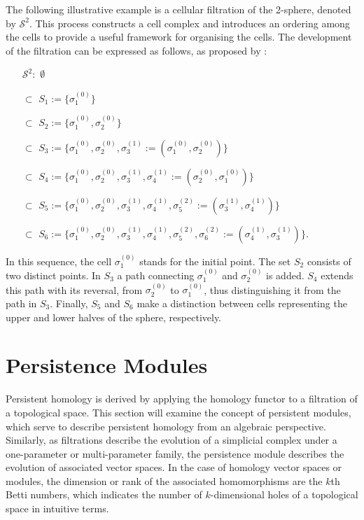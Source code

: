 \begin{example}
	\label{filteredsphere}
	The following illustrative example is a cellular filtration of the 2-sphere, denoted by $\mathcal{S}^{2}$. This process constructs a cell complex and introduces an ordering among the cells to provide a useful framework for organising the cells. The development of the filtration can be expressed as follows, as proposed by \cite[\S 2.2, Example]{de2011dualities}:
	\begin{itemize}
		\item[$\mathcal{S}^{2}:$] $\emptyset$
		\item[$\subset$] $S_{1} := \{\sigma_{1}^{(0)}\}$
		\item[$\subset$] $S_{2} := \{\sigma_{1}^{(0)}, \sigma_{2}^{(0)}\}$
		\item[$\subset$] $S_{3} := \{\sigma_{1}^{(0)}, \sigma_{2}^{(0)}, \sigma_{3}^{(1)} := (\sigma_{1}^{(0)}, \sigma_{2}^{(0)})\}$
		\item[$\subset$] $S_{4} := \{\sigma_{1}^{(0)}, \sigma_{2}^{(0)}, \sigma_{3}^{(1)}, \sigma_{4}^{(1)} := (\sigma_{2}^{(0)}, \sigma_{1}^{(0)})\}$
		\item[$\subset$] $S_{5} := \{\sigma_{1}^{(0)}, \sigma_{2}^{(0)}, \sigma_{3}^{(1)}, \sigma_{4}^{(1)}, \sigma_{5}^{(2)} := (\sigma_{3}^{(1)}, \sigma_{4}^{(1)})\}$
		\item[$\subset$] $S_{6} := \{\sigma_{1}^{(0)}, \sigma_{2}^{(0)}, \sigma_{3}^{(1)}, \sigma_{4}^{(1)}, \sigma_{5}^{(2)}, \sigma_{6}^{(2)} := (\sigma_{4}^{(1)}, \sigma_{3}^{(1)})\}.$
	\end{itemize}
	In this sequence, the cell $\sigma_{1}^{(0)}$ stands for the initial point. The set $S_{2}$ consists of two distinct points. In $S_{3}$ a path connecting $\sigma_{1}^{(0)}$ and $\sigma_{2}^{(0)}$ is added. $S_{4}$ extends this path with its reversal, from $\sigma_{2}^{(0)}$ to $\sigma_{1}^{(0)}$, thus distinguishing it from the path in $S_{3}$. Finally, $S_{5}$ and $S_{6}$ make a distinction between cells representing the upper and lower halves of the sphere, respectively.
\end{example}

\section{Persistence Modules}
\label{PersistenceModules}
Persistent homology is derived by applying the homology functor to a filtration of a topological space. This section will examine the concept of persistent modules, which serve to describe persistent homology from an algebraic perspective. Similarly, as filtrations describe the evolution of a simplicial complex under a one-parameter or multi-parameter family, the persistence module describes the evolution of associated vector spaces. In the case of homology vector spaces or modules, the dimension or rank of the associated homomorphisms are the $k$th Betti numbers, which indicates the number of $k$-dimensional holes of a topological space in intuitive terms.

